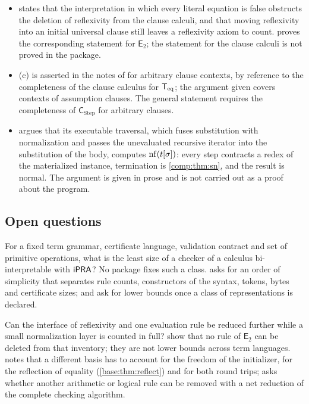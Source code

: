 \begin{itemize}
\item {} states that the interpretation in which every
 literal equation is false obstructs the deletion of reflexivity from the
 clause calculi, and that moving reflexivity into an initial universal
 clause still leaves a reflexivity axiom to count.
  proves the corresponding statement for
 $\mathsf{E}_2$; the statement for the clause calculi is not proved in the
 package.
\item {}(c) is asserted in the notes of
  for arbitrary clause contexts, by reference to the
 completeness of the clause calculus for $\mathsf{T}_{\mathrm{eq}}$; the argument given covers
 contexts of assumption clauses. The general statement requires the
 completeness of $\mathsf{C}_{\mathrm{Step}}$ for arbitrary clauses.
\item {} argues that its executable traversal, which
 fuses substitution with normalization and passes the unevaluated recursive
 iterator into the substitution of the body, computes $\operatorname{nf}(t[\sigma])$:
 every step contracts a redex of the materialized instance, termination is
 \cref{comp:thm:sn}, and the result is normal. The argument is given in
 prose and is not carried out as a proof about the program.
\end{itemize}

\subsection{Open questions}

\begin{question}
For a fixed term grammar, certificate language, validation contract and set
of primitive operations, what is the least size of a checker of a calculus
bi-interpretable with $\mathsf{iPRA}$? No package fixes such a class.
 asks for an order of simplicity that separates
rule counts, constructors of the syntax, tokens, bytes and certificate
sizes;  and  ask for
lower bounds once a class of representations is declared.
\end{question}

\begin{question}
Can the interface of reflexivity and one evaluation rule be reduced
further while a small normalization layer is counted in full?
 show that no rule of
$\mathsf{E}_2$ can be deleted from that inventory; they are not lower
bounds across term languages.  notes that a
different basis has to account for the freedom of the initializer, for the
reflection of equality (\cref{base:thm:reflect}) and for both round trips;
 asks whether another arithmetic or logical rule can be
removed with a net reduction of the complete checking algorithm.
\end{question}


